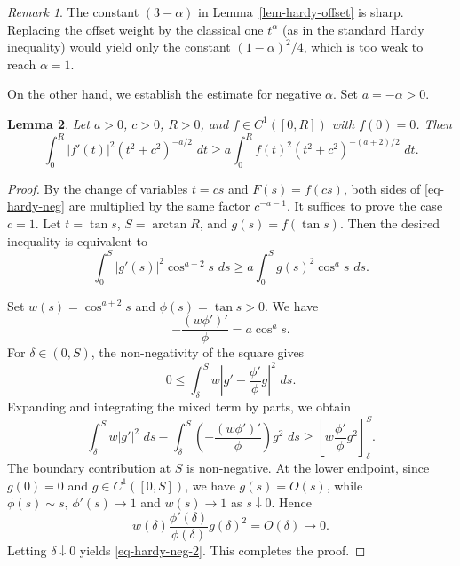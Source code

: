 \documentclass[12pt,leqno]{amsart}
\theoremstyle{plain} \newtheorem{thm}{Theorem}[section]
\theoremstyle{plain} \newtheorem{prop}[thm]{Proposition}
\theoremstyle{plain} \newtheorem{prob}[thm]{Problem}
\theoremstyle{definition} \newtheorem{defi}[thm]{Definition}
\theoremstyle{plain} \newtheorem{cor}[thm]{Corollary}
\theoremstyle{plain} \newtheorem{lem}[thm]{Lemma}
\theoremstyle{plain} \newtheorem{eg}{Example}[section]
\theoremstyle{remark} \newtheorem{rmk}[thm]{Remark}
\theoremstyle{plain} \newtheorem{conj}{Conjecture}
\numberwithin{equation}{section}
\newcommand{\dd}{\,d}
\begin{document}
\begin{rmk}
  The constant $(3-\alpha)$ in Lemma~\ref{lem-hardy-offset} is sharp.  Replacing the offset weight by
  the classical one $t^\alpha$ (as in the standard Hardy inequality)
  would yield only the constant $(1-\alpha)^2/4$, which is too weak
  to reach $\alpha=1$.
\end{rmk}

On the other hand, we establish the estimate for negative $\alpha$. Set
$a=-\alpha>0$.

\begin{lem}\label{lem-hardy-neg}
Let $a>0$, $c>0$, $R>0$, and $f\in C^1([0,R])$ with $f(0)=0$. Then
\begin{equation}\label{eq-hardy-neg}
 \int_0^R |f'(t)|^2(t^2+c^2)^{-a/2}\,\dd t
 \ge
 a\int_0^R f(t)^2(t^2+c^2)^{-(a+2)/2}\,\dd t.
\end{equation}
\end{lem}

\begin{proof}
By the change of variables $t=cs$ and $F(s)=f(cs)$, both sides of
\eqref{eq-hardy-neg} are multiplied by the same factor
$c^{-a-1}$.  It suffices to prove the case $c=1$. Let $t=\tan s$, $S=\arctan R$, and $g(s)=f(\tan s)$. Then the desired inequality is equivalent to
\begin{equation}\label{eq-hardy-neg-2}
     \int_0^S |g'(s)|^2\cos^{a+2}s\,\dd s
  \ge
     a \int_0^S g(s)^2\cos^a s\,\dd s .
\end{equation}

Set $w(s)=\cos^{a+2}s$ and $\phi(s)=\tan s>0$. We have
\[
 -\frac{(w\phi')'}{\phi}
 = a\cos^a s.
\]
For $\delta\in(0,S)$, the non-negativity of the square gives
\[
 0
 \le
 \int_\delta^S
 w\left|g'-\frac{\phi'}{\phi}g\right|^2\,\dd s .
\]
Expanding and integrating the mixed term by parts, we obtain
\[
 \int_\delta^S w|g'|^2\,\dd s
 -
 \int_\delta^S
 \left(-\frac{(w\phi')'}{\phi}\right)g^2\,\dd s
 \ge
 \left[
   w\frac{\phi'}{\phi}g^2
 \right]_{\delta}^{S}.
\]
The boundary contribution at $S$ is non-negative. At the lower
endpoint, since $g(0)=0$ and $g\in C^1([0,S])$, we have
$g(s)=O(s)$, while $ \phi(s)\sim s,\,\phi'(s)\to1$ and $w(s)\to1$ as $s\downarrow0$. Hence
\[
 w(\delta)\frac{\phi'(\delta)}{\phi(\delta)}g(\delta)^2
 =O(\delta)\to0 .
\]
Letting $\delta\downarrow0$ yields \eqref{eq-hardy-neg-2}. This completes the proof.
\end{proof}
\end{document}
